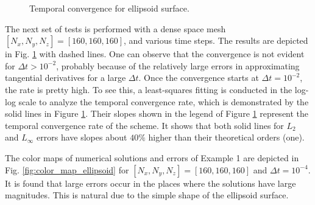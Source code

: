 \documentclass[dissertation]{uathesis}
\begin{document}
\begin{body}
\begin{flushleft}
\begin{figure}[!tb]
\begin{center}
	\end{center}
	\caption{Temporal convergence for ellipsoid surface.}
	\label{fig:temporal_convergence_ellipsoid}
\end{figure}
%
The next set of tests is performed with a dense space mesh $[N_{x},N_{y},N_{z}]=[160,160,160]$, and various time steps. The results are depicted in Fig. \ref{fig:temporal_convergence_ellipsoid} with dashed lines. 
One can observe that the convergence is not evident for  $\Delta t > 10^{-2}$,
probably because of the relatively large errors in approximating tangential derivatives for a large $\Delta t$. Once the convergence starts at $\Delta t=10^{-2}$, the rate is pretty high. To see this,  a least-squares fitting \cite{zhao2009matched} is conducted in the log-log scale to analyze the temporal convergence rate, which is demonstrated by the solid lines in Figure \ref{fig:temporal_convergence_ellipsoid}. Their slopes shown in the legend of 
Figure \ref{fig:temporal_convergence_ellipsoid}
represent the temporal convergence rate of the scheme. It shows that both solid lines for $L_2$ and $L_{\infty}$ errors have slopes about $40\%$ higher than their theoretical orders (one). 

\hspace{1cm} The color maps of numerical solutions and errors of Example 1 are depicted in Fig. \ref{fig:color_map_ellipsoid} for  $[N_{x},N_{y},N_{z}]=[160,160,160]$ and $\Delta t=10^{-4}$. It is found that large errors occur in the places where the solutions have large magnitudes. This is natural due to the simple shape of the ellipsoid surface.  


\end{flushleft}
\end{body}
\end{document}

